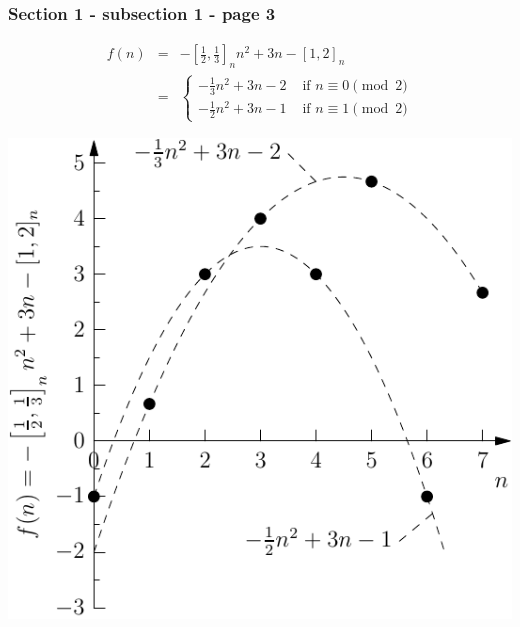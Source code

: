 \documentclass{beamer}
\begin{document}
\begin{frame}\frametitle{\textbf{\LARGE{\textrm{Section 1 - subsection 1 - page 3}}}}
    \begin{example}
        \centering
        {
        $$
        \begin{array}{rcl}
            f(n)
            &=&
            -\left[\frac{1}{2},\frac{1}{3}\right]_n n^2
            +3n-[1,2]_n
            \\
            &=&
            \begin{cases}
                -\frac{1}{3} n^2 +3n-2
                & \text{ if $n\equiv 0 \pmod 2$} \\
                -\frac{1}{2} n^2 +3n-1
                & \text{ if $n\equiv 1 \pmod 2$}
            \end{cases}
        \end{array}
        $$
        \begin{minipage}{0.4\textwidth}
            \includegraphics[width=\textwidth]{images/ex2_quasi_polynomial.pdf}
        \end{minipage}
        }
    \end{example}
\end{frame}
\end{document}
